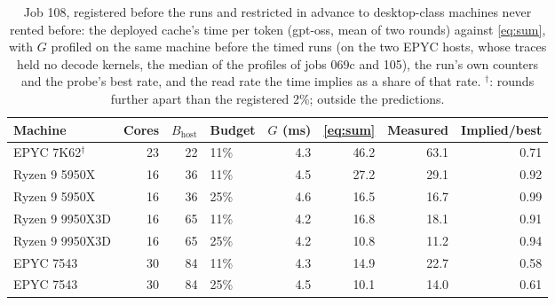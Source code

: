 \begin{table}[t]\centering\footnotesize
\caption{Job 108, registered before the runs and restricted in advance to desktop-class machines never rented before: the deployed cache's time per token (gpt-oss, mean of two rounds) against \cref{eq:sum}, with $G$ profiled on the same machine before the timed runs (on the two EPYC hosts, whose traces held no decode kernels, the median of the profiles of jobs 069c and 105), the run's own counters and the probe's best rate, and the read rate the time implies as a share of that rate. $^\dagger$: rounds further apart than the registered 2\%; outside the predictions.}\label{tab:job108}
\setlength\tabcolsep{3pt}\begin{tabular}{@{}lrrlrrrr@{}}\toprule
Machine & Cores & $B_{\mathrm{host}}$ & Budget & $G$ (ms) & \cref{eq:sum} & Measured & Implied/best \\\midrule
EPYC 7K62$^{\dagger}$ & 23 & 22 & 11\% & 4.3 & 46.2 & 63.1 & 0.71 \\
Ryzen 9 5950X & 16 & 36 & 11\% & 4.5 & 27.2 & 29.1 & 0.92 \\
Ryzen 9 5950X & 16 & 36 & 25\% & 4.6 & 16.5 & 16.7 & 0.99 \\
Ryzen 9 9950X3D & 16 & 65 & 11\% & 4.2 & 16.8 & 18.1 & 0.91 \\
Ryzen 9 9950X3D & 16 & 65 & 25\% & 4.2 & 10.8 & 11.2 & 0.94 \\
EPYC 7543 & 30 & 84 & 11\% & 4.3 & 14.9 & 22.7 & 0.58 \\
EPYC 7543 & 30 & 84 & 25\% & 4.5 & 10.1 & 14.0 & 0.61 \\
\bottomrule\end{tabular}\end{table}
